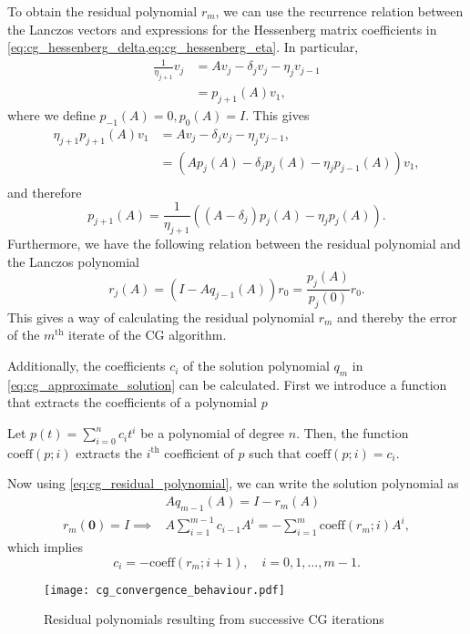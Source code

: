 To obtain the residual polynomial $r_m$, we can use the recurrence relation between the Lanczos vectors and expressions for the Hessenberg matrix coefficients in \cref{eq:cg_hessenberg_delta,eq:cg_hessenberg_eta}. In particular,
\begin{align*}
  \frac{1}{\eta_{j+1}} v_j & = A v_j - \delta_j v_j - \eta_j v_{j-1} \\
                           & = p_{j+1}(A) v_1,
\end{align*}
where we define $p_{-1}(A) = 0, p_0(A) = I$. This gives
\begin{align*}
  \eta_{j+1}p_{j+1}(A)v_1 & = A v_j - \delta_j v_j - \eta_j v_{j-1},                            \\
                          & = \left( A p_j(A) - \delta_j p_j(A) - \eta_j p_{j-1}(A) \right)v_1, \\
\end{align*}
and therefore
\begin{equation}
  p_{j+1}(A) = \frac{1}{\eta_{j+1}}\left( (A - \delta_j )p_j(A) - \eta_j p_{j}(A) \right).
  \label{eq:cg_lanczos_polynomial}
\end{equation}
Furthermore, we have the following relation between the residual polynomial and the Lanczos polynomial \cite[Section 3.2]{Meurant_Strakoš_2006}
\begin{equation}
  r_{j}(A) = (I-Aq_{j-1}(A))r_0 = \frac{p_{j}(A)}{p_{j}(0)}r_0.
  \label{eq:cg_residual_polynomial}
\end{equation}
This gives a way of calculating the residual polynomial $r_m$ and thereby the error of the $m^{\text{th}}$ iterate of the CG algorithm.

Additionally, the coefficients $c_i$ of the solution polynomial $q_m$ in \cref{eq:cg_approximate_solution} can be calculated. First we introduce a function that extracts the coefficients of a polynomial $p$
\begin{definition}
  Let $p(t) = \sum_{i=0}^n c_i t^i$ be a polynomial of degree $n$. Then, the function $\text{coeff}(p;i)$ extracts the $i^{\text{th}}$ coefficient of $p$ such that $\text{coeff}(p;i) = c_i$.
\end{definition}
Now using \cref{eq:cg_residual_polynomial}, we can write the solution polynomial as
\begin{align*}
                              & Aq_{m-1}(A) = I - r_m(A)                                                  \\
  r_m(\mathbf{0}) = I\implies & A\sum_{i=1}^{m-1} c_{i-1} A^i = -\sum_{i=1}^{m} \text{coeff}(r_m; i) A^i,
\end{align*}
which implies
\begin{equation}
  c_i = -\text{coeff}(r_m; i+1), \quad i = 0, 1, \dots, m-1.
  \label{eq:cg_solution_coefficients}
\end{equation}
\begin{figure}[H]
  \centering
  \texttt{[image: cg\_convergence\_behaviour.pdf]}
  \caption{Residual polynomials resulting from successive CG iterations}
  \label{fig:cg_convergence_behaviour}
\end{figure}

